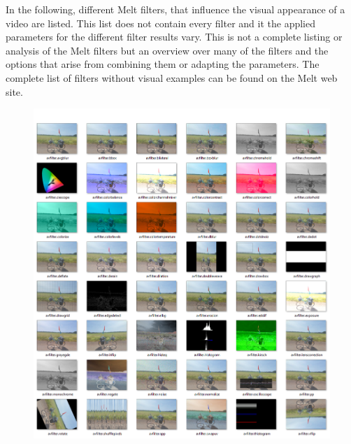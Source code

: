 \documentclass[../MasterThesis.tex]{subfiles}
\begin{document}
In the following, different Melt filters, that influence the visual appearance of a video are listed. This list does not contain every filter and it the applied parameters for the different filter results vary. This is not a complete listing or analysis of the Melt filters but an overview over many of the filters and the options that arise from combining them or adapting the parameters. The complete list of filters without visual examples can be found on the Melt web site.~\cite{melt_filters}
%
\begin{figure}[H]
	\includegraphics[width=1\textwidth]{Seite1.png}
\end{figure}
\end{document}
